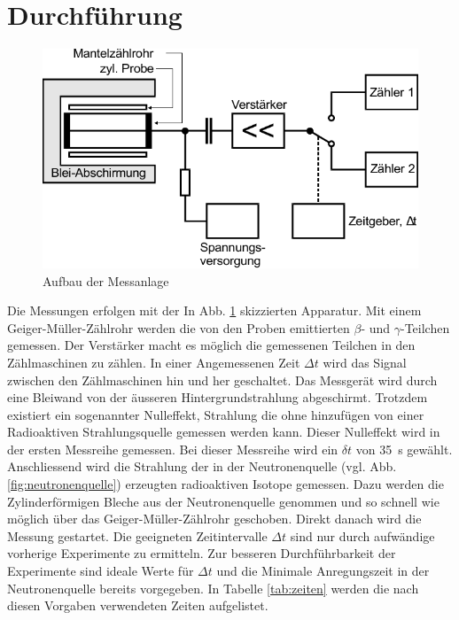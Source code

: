 \section{Durchführung}
\begin{figure}
    \centering
    \includegraphics{Abbildungen/Schaltplan.pdf}
    \caption{Aufbau der Messanlage \cite{man:v702}}
    \label{fig:Aufbau}
\end{figure}
Die Messungen erfolgen mit der In Abb. \ref{fig:Aufbau} skizzierten Apparatur.
Mit einem Geiger-Müller-Zählrohr werden die von den Proben emittierten
$\beta$- und $\gamma$-Teilchen gemessen. 
Der Verstärker macht es möglich die gemessenen Teilchen 
in den Zählmaschinen zu zählen. 
In einer Angemessenen Zeit $\Delta t$ wird das Signal zwischen den
Zählmaschinen hin und her geschaltet.
Das Messgerät wird durch eine Bleiwand von der äusseren 
Hintergrundstrahlung abgeschirmt. 
Trotzdem existiert ein sogenannter Nulleffekt, Strahlung 
die ohne hinzufügen von einer Radioaktiven Strahlungsquelle gemessen werden kann.
Dieser Nulleffekt wird in der ersten Messreihe gemessen.
Bei dieser Messreihe wird ein $\delta t$ von \qty{35}{\s} gewählt. 
Anschliessend wird die Strahlung der in der Neutronenquelle (vgl. Abb. \ref{fig:neutronenquelle})
erzeugten radioaktiven Isotope gemessen.
Dazu werden die Zylinderförmigen Bleche aus der Neutronenquelle genommen und so schnell
wie möglich über das Geiger-Müller-Zählrohr geschoben.
Direkt danach wird die Messung gestartet.
Die geeigneten Zeitintervalle $\Delta t$ sind nur durch aufwändige vorherige Experimente zu ermitteln.
Zur besseren Durchführbarkeit der Experimente sind ideale Werte für $\Delta t$
und die Minimale Anregungszeit in der Neutronenquelle bereits vorgegeben.
In Tabelle \ref{tab:zeiten} werden die nach diesen Vorgaben verwendeten Zeiten
aufgelistet.
